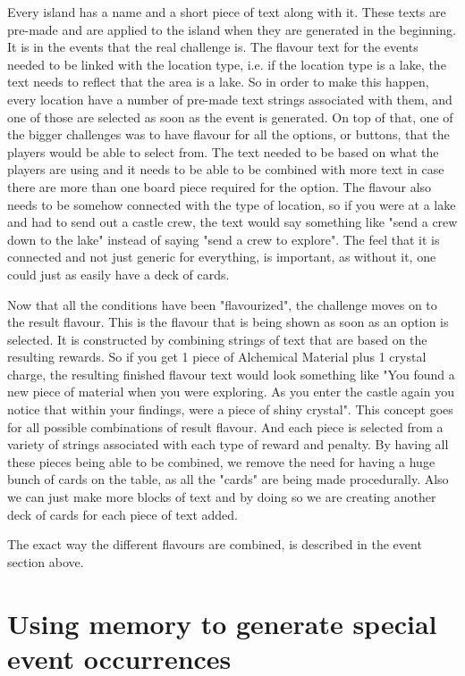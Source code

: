 \documentclass[a4paper,11pt]{report}
\begin{document}
Every island has a name and a short piece of text along with it. These texts are pre-made and are applied to the island when they are generated in the beginning. 
It is in the events that the real challenge is. The flavour text for the events needed to be linked with the location type, i.e. if the location type is a lake, the text needs to reflect that the area is a lake. So in order to make this happen, every location have a number of pre-made text strings associated with them, and one of those are selected as soon as the event is generated. On top of that, one of the bigger challenges was to have flavour for all the options, or buttons, that the players would be able to select from. The text needed to be based on what the players are using and it needs to be able to be combined with more text in case there are more than one board piece required for the option. The flavour also needs to be somehow connected with the type of location, so if you were at a lake and had to send out a castle crew, the text would say something like "send a crew down to the lake" instead of saying "send a crew to explore". The feel that it is connected and not just generic for everything, is important, as without it, one could just as easily have a deck of cards. 

Now that all the conditions have been "flavourized", the challenge moves on to the result flavour. This is the flavour that is being shown as soon as an option is selected. It is constructed by combining strings of text that are based on the resulting rewards. So if you get 1 piece of Alchemical Material plus 1 crystal charge, the resulting finished flavour text would look something like "You found a new piece of material when you were exploring. As you enter the castle again you notice that within your findings, were a piece of shiny crystal". 
This concept goes for all possible combinations of result flavour. And each piece is selected from a variety of strings associated with each type of reward and penalty. By having all these pieces being able to be combined, we remove the need for having a huge bunch of cards on the table, as all the "cards" are being made procedurally. Also we can just make more blocks of text and by doing so we are creating another deck of cards for each piece of text added.

The exact way the different flavours are combined, is described in the event section above.

\section{Using memory to generate special event occurrences}
\end{document}
